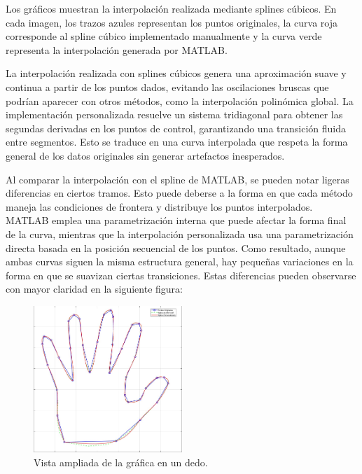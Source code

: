 \begin{homeworkProblem}
\begin{solucion}
Los gráficos muestran la interpolación realizada mediante splines cúbicos. En cada imagen, los trazos azules representan los puntos originales, la curva roja corresponde al spline cúbico implementado manualmente y la curva verde representa la interpolación generada por MATLAB.

La interpolación realizada con splines cúbicos genera una aproximación suave y continua a partir de los puntos dados, evitando las oscilaciones bruscas que podrían aparecer con otros métodos, como la interpolación polinómica global. La implementación personalizada resuelve un sistema tridiagonal para obtener las segundas derivadas en los puntos de control, garantizando una transición fluida entre segmentos. Esto se traduce en una curva interpolada que respeta la forma general de los datos originales sin generar artefactos inesperados.  

Al comparar la interpolación con el spline de MATLAB, se pueden notar ligeras diferencias en ciertos tramos. Esto puede deberse a la forma en que cada método maneja las condiciones de frontera y distribuye los puntos interpolados. MATLAB emplea una parametrización interna que puede afectar la forma final de la curva, mientras que la interpolación personalizada usa una parametrización directa basada en la posición secuencial de los puntos. Como resultado, aunque ambas curvas siguen la misma estructura general, hay pequeñas variaciones en la forma en que se suavizan ciertas transiciones. Estas diferencias pueden observarse con mayor claridad en la siguiente figura:  

\begin{figure}[H] %
    \centering
    \includegraphics[width=0.5\textwidth]{Figures/mano Andres.jpg} %
    \caption{Vista ampliada de la gráfica en un dedo.}
    \label{fig:detalle_dedo}
\end{figure}  


\end{solucion}
\end{homeworkProblem}
